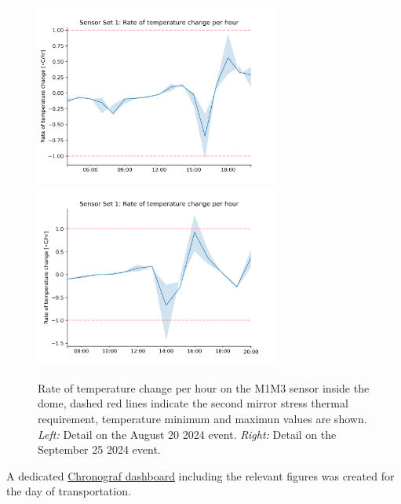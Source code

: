 \documentclass[SE,lsstdraft,authoryear,toc]{lsstdoc}
\begin{document}
\begin{figure}[h!]
  \includegraphics[width=8cm]{SITCOMTN-141_figures/Sensor1_1h_temp_derivative_e1.png}
  \includegraphics[width=8cm]{SITCOMTN-141_figures/Sensor1_1h_temp_derivative_e2.png}
  \caption{Rate of temperature change per hour on the M1M3 sensor inside the dome, dashed red lines indicate the second mirror stress thermal requirement, temperature minimum and maximun values are shown. \textit{Left:} Detail on the August 20 2024 event. \textit{Right:} Detail on the September 25 2024 event.}
  \label{fig_set1_derivative_events}
\end{figure}

A dedicated \href{https://summit-lsp.lsst.codes/chronograf/sources/1/dashboards/349?refresh=Paused&lower=2024-09-21T03%3A00%3A00.000Z&upper=2024-09-23T03%3A00%3A00.000Z}{Chronograf dashboard} including the relevant figures was created for the day of transportation.
\end{document}
